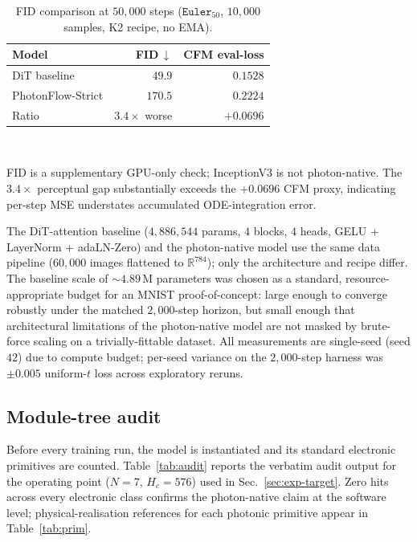 \documentclass[conference]{IEEEtran}
\begin{document}
\begin{table}[tbp]
\caption{FID comparison at $50{,}000$ steps ($\texttt{Euler}_{50}$,
$10{,}000$ samples, K2 recipe, no EMA).}
\label{tab:fid}
\centering\footnotesize
\setlength{\tabcolsep}{4pt}
\renewcommand{\arraystretch}{1.1}
\begin{tabular}{@{}lrr@{}}
\toprule
\textbf{Model} & \textbf{FID\,$\downarrow$} & \textbf{CFM eval-loss} \\
\midrule
DiT baseline       & $49.9$  & $0.1528$ \\
PhotonFlow-Strict  & $170.5$ & $0.2224$ \\
\midrule
Ratio              & $3.4{\times}$ worse & $+0.0696$ \\
\bottomrule
\end{tabular}\\[2pt]
{\raggedright\scriptsize FID is a supplementary GPU-only check;
InceptionV3 is not photon-native.  The $3.4{\times}$ perceptual gap
substantially exceeds the $+0.0696$ CFM proxy, indicating
per-step MSE understates accumulated ODE-integration error.\par}
\end{table}

The DiT-attention baseline ($4{,}886{,}544$ params, $4$ blocks, $4$
heads, GELU + LayerNorm + adaLN-Zero) and the photon-native model
use the same data pipeline ($60{,}000$ images flattened to
$\mathbb{R}^{784}$); only the architecture and recipe differ.
The baseline scale of $\sim\!4.89$\,M parameters was chosen as a
standard, resource-appropriate budget for an MNIST proof-of-concept:
large enough to converge robustly under the matched $2{,}000$-step
horizon, but small enough that architectural limitations of the
photon-native model are not masked by brute-force scaling on a
trivially-fittable dataset.  All measurements are single-seed (seed
$42$) due to compute budget; per-seed variance on the
$2{,}000$-step harness was $\pm 0.005$ uniform-$t$ loss across
exploratory reruns.

\subsection{Module-tree audit}
\label{sec:exp-audit}
Before every training run, the model is instantiated and its
standard electronic primitives are counted.  Table~\ref{tab:audit}
reports the verbatim audit output for the operating point
($N{=}7$, $H_c{=}576$) used in Sec.~\ref{sec:exp-target}.  Zero
hits across every electronic class confirms the photon-native
claim at the software level; physical-realisation references for
each photonic primitive appear in Table~\ref{tab:prim}.
\end{document}
